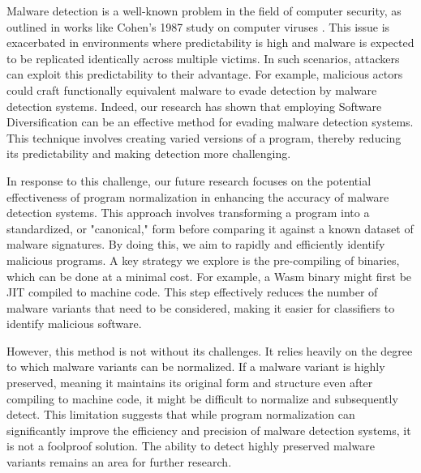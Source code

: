 \begin{strategy}

    Malware detection is a well-known problem in the field of computer security, as outlined in works like Cohen's 1987 study on computer viruses \cite{cohen1987computer}. 
    This issue is exacerbated in environments where predictability is high and malware is expected to be replicated identically across multiple victims. 
    In such scenarios, attackers can exploit this predictability to their advantage. 
    For example, malicious actors could craft functionally equivalent malware to evade detection by malware detection systems.
    Indeed, our research has shown that employing Software Diversification can be an effective method for evading malware detection systems. 
    This technique involves creating varied versions of a program, thereby reducing its predictability and making detection more challenging. 
   

    In response to this challenge, our future research focuses on the potential effectiveness of program normalization in enhancing the accuracy of malware detection systems. 
    This approach involves transforming a program into a standardized, or "canonical," form before comparing it against a known dataset of malware signatures. 
    By doing this, we aim to rapidly and efficiently identify malicious programs. A key strategy we explore is the pre-compiling of \Wasm binaries, which can be done at a minimal cost. 
    For example, a Wasm binary might first be JIT compiled to machine code. 
    This step effectively reduces the number of malware variants that need to be considered, making it easier for classifiers to identify malicious software.


    However, this method is not without its challenges. 
    It relies heavily on the degree to which malware variants can be normalized.
    If a malware variant is highly preserved, meaning it maintains its original form and structure even after compiling to machine code, it might be difficult to normalize and subsequently detect. 
    This limitation suggests that while program normalization can significantly improve the efficiency and precision of malware detection systems, it is not a foolproof solution. 
    The ability to detect highly preserved malware variants remains an area for further research.
    

\end{strategy}



